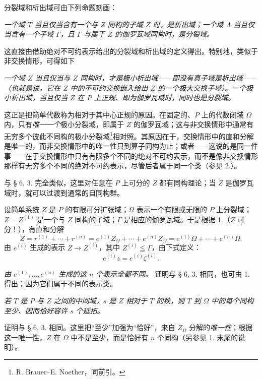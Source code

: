 分裂域和析出域可由下列命题刻画：

\noindent\textbf{} \emph{一个域 \(T\) 当且仅当含有一个与 \(Z\) 同构的子域 \(Z\) 时，是析出域；一个域 \(\Lambda\) 当且仅当含有一个子域 \(\Gamma\)，且 \(\Gamma\) 与属于 \(Z\) 的伽罗瓦域同构时，是分裂域。}

这直接由借助绝对不可约表示给出的分裂域和析出域的定义得出。特别地，类似于非交换情形，可得如下

\noindent\textbf{} \emph{一个域 \(Z\) 当且仅当与 \(Z\) 同构时，才是极小析出域——即没有真子域是析出域——（也就是说，它在 \(Z\) 中的不可约交换嵌入给出 \(Z\) 的一个极大交换子域）。一个极小析出域，当且仅当 \(Z\) 在 \(P\) 上正规、即为伽罗瓦域时，同时也是分裂域。}

这正是把简单代数称为相对于其中心正规的原因。在固定的、\(P\) 上的代数闭域 \(\Omega\) 内，只有\emph{唯一一个}极小分裂域，即属于 \(Z\) 的伽罗瓦域；这与非交换情形中通常有无穷多个彼此不同构的极小分裂域\footnote{R. Brauer--E. Noether，同前引。}相对照。其原因在于，交换情形中的直和分解是唯一的，而非交换情形中的唯一性只到算子同构为止；或者——这说的是同一件事——在于交换情形中只有有限多个不同的绝对不可约表示，而不是像非交换情形那样有无穷多个不同的绝对不可约表示，尽管后者属于同一个类（参见 2.）。

\medskip
\noindent\textbf{}\quad 与 § 6, 3. 完全类似，这里对任意在 \(P\) 上可分的 \(Z\) 都有同构理论；当 \(Z\) 是伽罗瓦域时，就可以过渡到通常的自同构群。

\medskip
\noindent\textbf{}\quad 设简单系统 \(Z\) 是 \(P\) 的有限可分扩张域；\(\Omega\) 表示一个有限或无限的 \(P\) 上分裂域；\(Z=Z^{(1)}\) 是一个与 \(Z\) 同构的子域；\(\Gamma\) 是相应的伽罗瓦域。于是根据 1.（\(Z\) 可分！），有直和分解
\[
        Z=r^{(1)}+\cdots+r^{(n)}
        =e^{(1)}Z_\Omega+\cdots+e^{(n)}Z_\Omega
        =e^{(1)}\Omega+\cdots+e^{(n)}\Omega .
\]
由 \(e^{(i)}\) 生成的表示 \(Z\to Z^{(i)}\)，其中 \(Z^{(i)}\leqq\Gamma\)，由下式定义：
\[
        e^{(i)}z=e^{(i)}\zeta^{(i)}.
\]

\noindent\textbf{} \emph{由 \(e^{(1)},\ldots,e^{(n)}\) 生成的这 \(n\) 个表示全都不同。} 证明与 § 6, 3. 相同，也可由 1. 得出；因为它们属于不同的表示类。

\noindent\textbf{} \emph{若 \(T\) 是 \(P\) 与 \(Z\) 之间的中间域，\(s\) 是 \(Z\) 相对于 \(T\) 的秩，则 \(T\) 到 \(\Omega\) 中的每个同构至少、因而恰好容许 \(s\) 个延拓。}

证明与 § 6, 3. 相同。这里把“至少”加强为“恰好”，来自 \(Z_\Omega\) 分解的\emph{唯一性}；根据这一唯一性，\(Z\) 在 \(\Omega\) 中不是至少，而是恰好有 \(n\) 个同构（另参见 1. 末尾的说明）。

